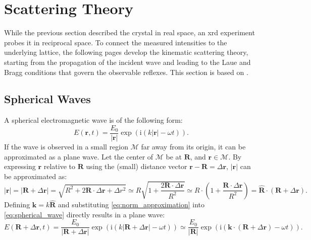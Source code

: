 \section{Scattering Theory}
While the previous section described the crystal in real space, an \ac{xrd}
experiment probes it in reciprocal space. To connect the measured intensities to the
underlying lattice, the following pages develop the kinematic scattering theory, starting
from the propagation of the incident wave and leading to the Laue and Bragg conditions
that govern the observable reflexes. This section is based on \autocite{wsi2007hrxrd}.

\subsection{Spherical Waves}
A spherical electromagnetic wave is of the following form:
\begin{equation}
	E(\mathbf{r}, t)=\frac{E_{0}}{\lvert \mathbf{r} \rvert }\exp(\mathrm{i}(k \lvert
	\mathbf{r}\rvert - \omega t)). \label{eq:spherical_wave}
\end{equation}
If the wave is observed in a small region $\mathcal{M}$ far away from its origin,
it can be approximated as a plane wave. Let the center of $\mathcal{M}$ be at
$\mathbf{R}$, and $\mathbf{r}\in \mathcal{M}$. By expressing $\mathbf{r}$
relative to $\mathbf{R}$ using the (small) distance vector
$\mathbf{r}-\mathbf{R}=\Delta{\mathbf{r}}$, $\lvert \mathbf{r}\rvert$ can be approximated
as:
\begin{equation}
	\lvert \mathbf{r}\rvert =\lvert \mathbf{R}+\Delta \mathbf{r}\rvert =\sqrt{ R^{2}+2\mathbf{R}\cdot\Delta
	\mathbf{r}+\Delta r^{2}}\simeq R \sqrt{ 1+\frac{2\mathbf{R}\cdot\Delta \mathbf{r}}{R^{2}}}
	\simeq R\cdot\left( 1+\frac{\mathbf{R}\cdot\Delta \mathbf{r}}{R^{2}}\right) =\hat
	{\mathbf{R}}\cdot(\mathbf{R}+\Delta \mathbf{r}). \label{eq:norm_approximation}
\end{equation}
Defining $\mathbf{k}=k \hat{\mathbf{R}}$ and substituting
\cref{eq:norm_approximation} into \cref{eq:spherical_wave} directly results in a
plane wave:
\begin{equation}
	E(\mathbf{R}+\Delta\mathbf{r}, t) =\frac{E_{0}}{\lvert \mathbf{R}+\Delta\mathbf{r}
	\rvert }\exp(\mathrm{i}(k \lvert \mathbf{R}+\Delta\mathbf{r}\rvert - \omega t))
	\simeq \frac{E_{0}}{\lvert \mathbf{R} \rvert }\exp(\mathrm{i}(\mathbf{k}\cdot(\mathbf{R}
	+\Delta \mathbf{r})-\omega t)).
\end{equation}

